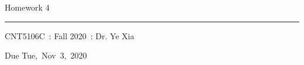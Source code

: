\documentclass[fleqn]{article}
\newcommand{\myCourse}{CNT5106C}
\newcommand{\mySection}{Fall 2020}
\newcommand{\myTeacher}{Dr. Ye Xia}
\newcommand{\myAssignment}{Homework 4}
\newcommand{\myDueDate}{Tue,\ Nov\ 3,\ 2020}
\begin{document}
\title{\vspace{-1in}} %
\author{} %
\date{} %
\maketitle %

\usebox{\myTitleSignature}
\vspace{1in} %

{\centering \huge \myAssignment \par}
{\centering \noindent\rule{4in}{0.1pt} \par}
\vspace{0.05in}
{\centering \myCourse~: \mySection~: \myTeacher \par}
{\centering Due \myDueDate \par}
\vspace{1in}

\tableofcontents
\newpage

\end{document}
